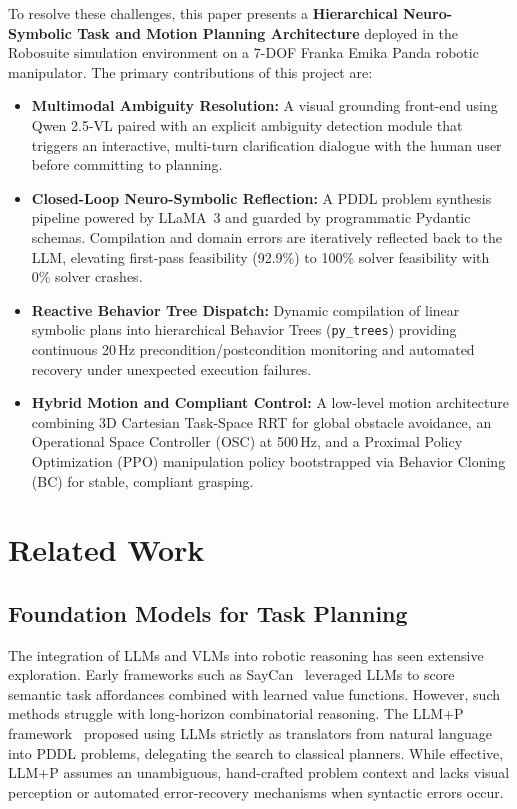 \documentclass[conference]{IEEEtran}
\begin{document}
To resolve these challenges, this paper presents a \textbf{Hierarchical Neuro-Symbolic Task and Motion Planning Architecture} deployed in the Robosuite simulation environment on a 7-DOF Franka Emika Panda robotic manipulator. The primary contributions of this project are:
\begin{itemize}
    \item \textbf{Multimodal Ambiguity Resolution:} A visual grounding front-end using Qwen 2.5-VL paired with an explicit ambiguity detection module that triggers an interactive, multi-turn clarification dialogue with the human user before committing to planning.
    \item \textbf{Closed-Loop Neuro-Symbolic Reflection:} A PDDL problem synthesis pipeline powered by LLaMA~3 and guarded by programmatic Pydantic schemas. Compilation and domain errors are iteratively reflected back to the LLM, elevating first-pass feasibility (92.9\%) to 100\% solver feasibility with 0\% solver crashes.
    \item \textbf{Reactive Behavior Tree Dispatch:} Dynamic compilation of linear symbolic plans into hierarchical Behavior Trees (\texttt{py\_trees}) providing continuous 20\,Hz precondition/postcondition monitoring and automated recovery under unexpected execution failures.
    \item \textbf{Hybrid Motion and Compliant Control:} A low-level motion architecture combining 3D Cartesian Task-Space RRT for global obstacle avoidance, an Operational Space Controller (OSC) at 500\,Hz, and a Proximal Policy Optimization (PPO) manipulation policy bootstrapped via Behavior Cloning (BC) for stable, compliant grasping.
\end{itemize}

\section{Related Work}
\label{sec:related_work}

\subsection{Foundation Models for Task Planning}
The integration of LLMs and VLMs into robotic reasoning has seen extensive exploration. Early frameworks such as SayCan~\cite{ahn2022can} leveraged LLMs to score semantic task affordances combined with learned value functions. However, such methods struggle with long-horizon combinatorial reasoning. The LLM+P framework~\cite{liu2023llmp} proposed using LLMs strictly as translators from natural language into PDDL problems, delegating the search to classical planners. While effective, LLM+P assumes an unambiguous, hand-crafted problem context and lacks visual perception or automated error-recovery mechanisms when syntactic errors occur.
\end{document}
